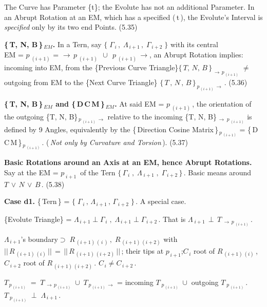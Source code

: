 \documentclass[12pt]{article} %
\begin{document}
{\noindent The Curve has Parameter \{t\}; the Evolute has not an additional Parameter. In an Abrupt Rotation at an EM, which has a specified (\,t\,), the Evolute's Interval is \textsl{specified} only by its two end Points. \qquad \qquad (5.35)

\noindent \textbf{\{\,T, N, B\,\}$_{\,EM}$.} \; In a Tern, say $\big\{\;\Gamma_{\,i}\,,\;\Lambda_{\,i+1}\,,\;\Gamma_{\,i+2}\;\big\}$ with its central \\EM = $p_{\;(i+1)}$ = $\to\,p_{\;(i+1)}\;\,\cup\;\,p_{\;(i+1)}\,\to$\;, \;an Abrupt Rotation implies:\\incoming into EM, from the \{Previous Curve Triangle\}\;$\{\,T,\,N,\,B\,\}_{\,\to\,p_{\,(i+1)}}\;\neq$\\outgoing from EM to the \{Next Curve Triangle\}\; $\{\,T\,,\,N\,,\,B\,\}_{\,p_{\,(i+1)}\,\to}$\,. (5.36) 

\noindent \textbf{\{\,T, N, B\,\}$_{\,EM}$ and \{\,D\,C\,M\,\}$_{\,EM}$.} At said EM = $p_{\;(i+1)}$\,, the orientation of the outgoing \{T, N, B\}$_{\,p_{\;(i+1)}\,\to}$ relative to the incoming \{T, N, B\}$_{\,\to\;p_{\;(i+1)}}$ is defined by 9 Angles, equivalently by the \{\,Direction Cosine Matrix\,\}$_{\,p_{\;(i+1)}}$ = \{\,D\,C\,M\,\}$_{\,p_{\;(i+1)}}$\,. (\,\textsl{Not only by Curvature and Torsion}\,). \qquad \qquad \qquad (5.37)

\noindent \textbf{Basic Rotations around an Axis at an EM, hence Abrupt Rotations.} Say at the EM = $p_{\;i+1}$\, of the Tern $\{\,\Gamma_{\,i}\;,\;\Lambda_{\;i+1}\;,\;\Gamma_{\,i+2}\,\}$\,. Basic means around\, $T\,\vee\,N\,\vee\,B$\,. \qquad (5.38)

\noindent \textbf{Case d1.} \{\,Tern\,\} = $\big\{\;\Gamma_{\,i}\,,\,\Lambda_{\,i+1}\,,\,\Gamma_{\,i+2}\;\big\}$\,. A special case.

\noindent \{Evolute Triangle\} = $\Lambda_{\,i+1} \perp \Gamma_{\,i}\;,\;\Lambda_{\,i+1} \perp \Gamma_{\,i+2}$\,. That is $\Lambda_{\;i+1}\,\perp\,T_{\;\to\,p_{\;(i+1)}}$\,.

\noindent $\Lambda_{\,i+1}$'s boundary\;$\supset\;R_{\,(i+1)\,(\,i\,)}\,,\;R_{\,(i+1)\,(i+2)}$ with $||\,R_{\,(i+1)\,(i)}\,||\,=\,||\,R_{\,(i+1)\,(i+2)}\,||$\,; their tips at \;$p_{\,i+1}$\;;\;$C_{\,i}$ root of $R_{\,(i+1)\,(i)}$\,,\;$C_{\,i+2}$ root of $R_{\,(i+1)\,(i+2)}$\,. $C_{\,i} \neq  C_{\,i+2}$\,.  

\noindent $T_{\,p_{\,(i+1)}}\;=\;T_{\,\to\,p_{\,(i+1)}}\;\cup\;T_{\,p_{\,(i+1)}\,\to}$ = incoming $T_{\;p_{\,(i+1)}}\;\cup$ outgoing $T_{\;p_{\;(i+1)}}$\,. $T_{\;p_{\,(i+1)}}\;\perp\;\Lambda_{\,i+1}$\,. 

}
\end{document}
